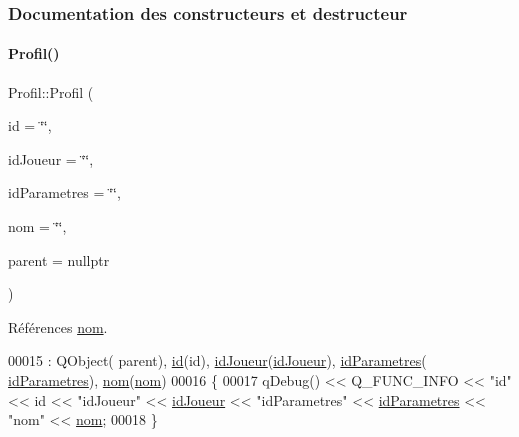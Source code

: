 \subsubsection{Documentation des constructeurs et destructeur}
\mbox{\label{class_profil_a4a208a6e5cf119025899b4ec1f3a8e08}} 
\paragraph{\texorpdfstring{Profil()}{Profil()}}
{\footnotesize\ttfamily Profil\+::\+Profil (\begin{DoxyParamCaption}\item[{Q\+String}]{id = {\ttfamily \char`\"{}\char`\"{}},  }\item[{Q\+String}]{id\+Joueur = {\ttfamily \char`\"{}\char`\"{}},  }\item[{Q\+String}]{id\+Parametres = {\ttfamily \char`\"{}\char`\"{}},  }\item[{Q\+String}]{nom = {\ttfamily \char`\"{}\char`\"{}},  }\item[{Q\+Object $\ast$}]{parent = {\ttfamily nullptr} }\end{DoxyParamCaption})\hspace{0.3cm}{\ttfamily [explicit]}}



Références \hyperlink{class_profil_a919585bdd5c7e7382e6a25c5152d0ca3}{nom}.


\begin{DoxyCode}
00015                                                                                               : QObject(
      parent), \hyperlink{class_profil_ac2a62326a3156d5e67011d3dcc063e40}{id}(\textcolor{keywordtype}{id}), \hyperlink{class_profil_a0d8277364c321a3797f91e3c32dbe47f}{idJoueur}(\hyperlink{class_profil_a0d8277364c321a3797f91e3c32dbe47f}{idJoueur}), \hyperlink{class_profil_a2cdcb0b7614e783ba20ae93eaefebd0c}{idParametres}(
      \hyperlink{class_profil_a2cdcb0b7614e783ba20ae93eaefebd0c}{idParametres}), \hyperlink{class_profil_a919585bdd5c7e7382e6a25c5152d0ca3}{nom}(\hyperlink{class_profil_a919585bdd5c7e7382e6a25c5152d0ca3}{nom})
00016 \{
00017     qDebug() << Q\_FUNC\_INFO << \textcolor{stringliteral}{"id"} << \textcolor{keywordtype}{id} << \textcolor{stringliteral}{"idJoueur"} << \hyperlink{class_profil_a0d8277364c321a3797f91e3c32dbe47f}{idJoueur} << \textcolor{stringliteral}{"idParametres"} << 
      \hyperlink{class_profil_a2cdcb0b7614e783ba20ae93eaefebd0c}{idParametres} << \textcolor{stringliteral}{"nom"} << \hyperlink{class_profil_a919585bdd5c7e7382e6a25c5152d0ca3}{nom};
00018 \}
\end{DoxyCode}


